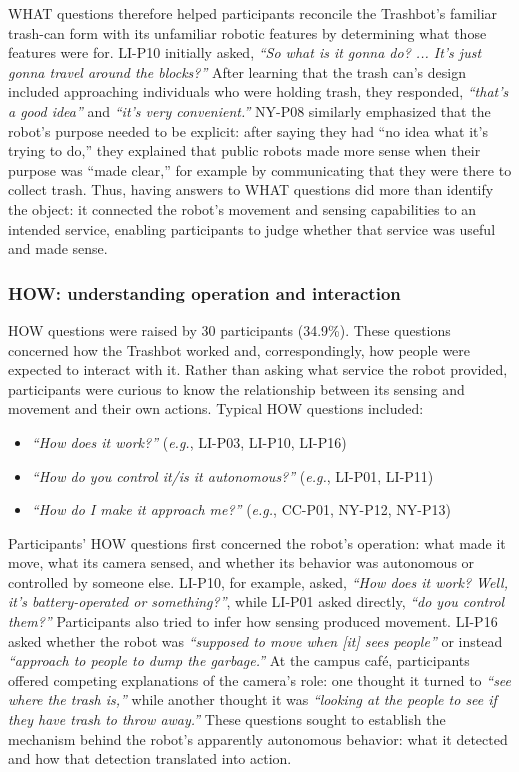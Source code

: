 WHAT questions therefore helped participants reconcile the Trashbot's familiar trash-can form with its unfamiliar robotic features by determining what those features were for. LI-P10 initially asked, \emph{``So what is it gonna do? ... It's just gonna travel around the blocks?''} After learning that the trash can's design included approaching individuals who were holding trash, they responded, \emph{``that's a good idea''} and \emph{``it's very convenient.''} NY-P08 similarly emphasized that the robot's purpose needed to be explicit: after saying they had ``no idea what it's trying to do,'' they explained that public robots made more sense when their purpose was ``made clear,'' for example by communicating that they were there to collect trash. Thus, having answers to WHAT questions did more than identify the object: it connected the robot's movement and sensing capabilities to an intended service, enabling participants to judge whether that service was useful and made sense.

\subsubsection{HOW: understanding operation and interaction}
HOW questions were raised by 30 participants (34.9\%). These questions concerned how the Trashbot worked and, correspondingly, how people were expected to interact with it. Rather than asking what service the robot provided, participants were curious to know the relationship between its sensing and movement and their own actions. Typical HOW questions included:
\begin{itemize}
    \item \emph{``How does it work?''} (\textit{e.g.}, LI-P03, LI-P10, LI-P16)
    \item \emph{``How do you control it/is it autonomous?''} (\textit{e.g.}, LI-P01, LI-P11)
    \item \emph{``How do I make it approach me?''} (\textit{e.g.}, CC-P01, NY-P12, NY-P13)
\end{itemize}

Participants' HOW questions first concerned the robot's operation: what made it move, what its camera sensed, and whether its behavior was autonomous or controlled by someone else. LI-P10, for example, asked, \emph{``How does it work? Well, it's battery-operated or something?''}, while LI-P01 asked directly, \emph{``do you control them?''} Participants also tried to infer how sensing produced movement. LI-P16 asked whether the robot was \emph{``supposed to move when [it] sees people''} or instead \emph{``approach to people to dump the garbage.''} At the campus café, participants offered competing explanations of the camera's role: one thought it turned to \emph{``see where the trash is,''} while another thought it was \emph{``looking at the people to see if they have trash to throw away.''} These questions sought to establish the mechanism behind the robot's apparently autonomous behavior: what it detected and how that detection translated into action. 

